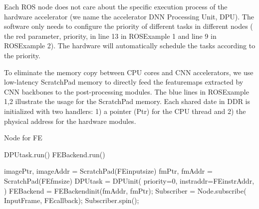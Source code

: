 Each ROS node does not care about the specific execution process of the hardware accelerator (we name the accelerator DNN Processing Unit, DPU). The software only needs to configure the priority of different tasks in different nodes ( the red parameter, priority, in line 13 in ROSExample 1 and line 9 in ROSExample 2). The hardware will automatically schedule the tasks according to the priority.

To eliminate the memory copy between CPU cores and CNN accelerators, we use low-latency ScratchPad memory \cite{Banakar2002Scratchpad} to directly feed the featuremaps extracted by CNN backbones to the post-processing modules. The blue lines in  ROSExample 1,2 illustrate the usage for the ScratchPad memory. Each shared date in DDR is initialized with two handlers: 1) a pointer (Ptr) for the CPU thread and 2) the physical address for the hardware modules. 

\begin{algorithm}[h]
    \caption{ Node for FE }
    \begin{algorithmic}[1]
        \State DPUtask.run()
        \State FEBackend.run()
        \EndFunction

        \State imagePtr, imageAddr = ScratchPad(FEinputsize)
        \State fmPtr, fmAddr = ScratchPad(FEfmsize)
        \State DPUtask = DPUinit({\color{red}  priority=0},{\color{blue} instraddr=FEinstrAddr, }
        \State \qquad \qquad \qquad {} ) 
        \State FEBackend = FEBackendinit({\color{blue}fmAddr, fmPtr});
        \State Subscriber = Node.subscribe( InputFrame, FEcallback);
        \State Subscriber.spin();
        \EndFunction
    \end{algorithmic}
\end{algorithm}

